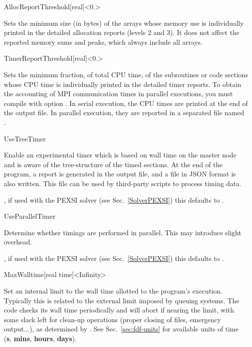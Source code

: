 \begin{fdfentry}{AllocReportThreshold}[real]<$0.$>

Sets the minimum size (in bytes) of the arrays whose memory use is
individually printed in the detailed allocation reports (levels 2 and
3). It does not affect the reported memory sums and peaks, which
always include all arrays.
  
\end{fdfentry}

\begin{fdfentry}{TimerReportThreshold}[real]<$0.$>

  Sets the minimum fraction, of total CPU time, of the subroutines or
  code sections whose CPU time is individually printed in the detailed
  timer reports. To obtain the accounting of MPI communication times
  in parallel executions, you must compile with option
  .
  In serial execution, the CPU times are printed at the end of the
  output file. In parallel execution, they are reported in a separated
  file named .
  
\end{fdfentry}

\begin{fdflogicalF}{UseTreeTimer}

  Enable an experimental timer which is based on wall time on the
  master node and is aware of the tree-structure of the timed
  sections. At the end of the program, a report is generated in the
  output file, and a  file in JSON format is also
  written.  This file can be used by
  third-party scripts to process timing data.

  \note, if used with the PEXSI solver (see Sec.~\ref{SolverPEXSI})
  this defaults to \fdftrue.
  
\end{fdflogicalF}


\begin{fdflogicalT}{UseParallelTimer}

  Determine whether timings are performed in parallel. This may
  introduce slight overhead.

  \note, if used with the PEXSI solver (see Sec.~\ref{SolverPEXSI})
  this defaults to \fdffalse.
  
\end{fdflogicalT}

\begin{fdfentry}{MaxWalltime}[real time]<Infinity>

  Set an internal limit to the wall time allotted to the
  program's execution. Typically this is related to the external limit
  imposed by queuing systems. The code checks its wall time periodically
  and will abort if nearing the limit, with some slack left for clean-up
  operations (proper closing of files, emergency output...), as determined
  by . See Sec.~\ref{sec:fdf-units} for available
  units of time (\textbf{s}, \textbf{mins}, \textbf{hours}, \textbf{days}).

\end{fdfentry}


